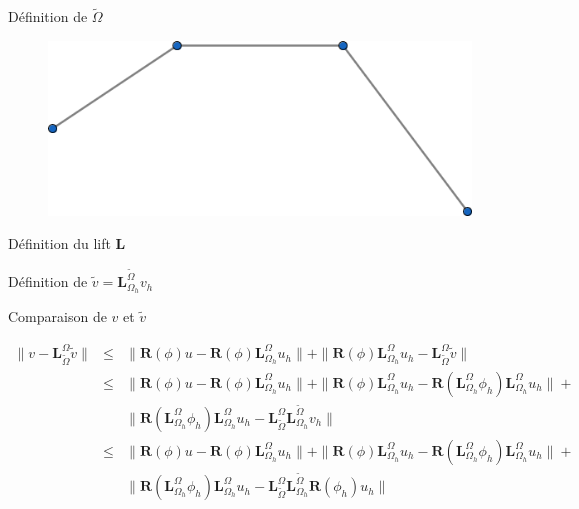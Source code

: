 \[\]
Définition de $\widetilde{\Omega}$

\begin{figure}[!h]
\centering
\includegraphics[scale=0.65]{images/Omega_h_tilde.png}
\caption{}
\label{fig:omega_h_tilde}
\end{figure}

\[\]
Définition du lift $\mathbf{L}$

\[\]
Définition de $\widetilde{v}=\mathbf{L}_{\Omega_h}^{\widetilde{\Omega}}v_h$

\[\]
Comparaison de $v$ et $\widetilde{v}$

\begin{eqnarray*}
\|v-\mathbf{L}_{\widetilde{\Omega}}^\Omega\widetilde{v}\|&\leq&\|\mathbf{R}(\phi)u-\mathbf{R}(\phi)\mathbf{L}_{\Omega_h}^\Omega u_h\|+\|\mathbf{R}(\phi)\mathbf{L}_{\Omega_h}^\Omega u_h - \mathbf{L}_{\widetilde{\Omega}}^\Omega\widetilde{v}\|\\
&\leq&\|\mathbf{R}(\phi)u-\mathbf{R}(\phi)\mathbf{L}_{\Omega_h}^\Omega u_h\|+\|\mathbf{R}(\phi)\mathbf{L}_{\Omega_h}^\Omega u_h - \mathbf{R}(\mathbf{L}_{\Omega_h}^\Omega\phi_h)\mathbf{L}_{\Omega_h}^\Omega u_h\|+\\
&&\| \mathbf{R}(\mathbf{L}_{\Omega_h}^\Omega\phi_h)\mathbf{L}_{\Omega_h}^\Omega u_h - \mathbf{L}_{\widetilde{\Omega}}^\Omega\mathbf{L}_{\Omega_h}^{\widetilde{\Omega}}v_h\|\\
&\leq&\|\mathbf{R}(\phi)u-\mathbf{R}(\phi)\mathbf{L}_{\Omega_h}^\Omega u_h\|+\|\mathbf{R}(\phi)\mathbf{L}_{\Omega_h}^\Omega u_h - \mathbf{R}(\mathbf{L}_{\Omega_h}^\Omega\phi_h)\mathbf{L}_{\Omega_h}^\Omega u_h\|+\\
&&\| \mathbf{R}(\mathbf{L}_{\Omega_h}^\Omega\phi_h)\mathbf{L}_{\Omega_h}^\Omega u_h - \mathbf{L}_{\widetilde{\Omega}}^\Omega\mathbf{L}_{\Omega_h}^{\widetilde{\Omega}}\mathbf{R}(\phi_h)u_h\|
\end{eqnarray*}




